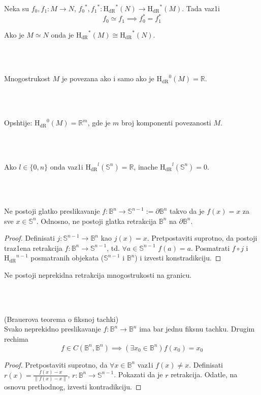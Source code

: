 \documentclass[a4paper,12pt]{article}
\newcommand{\RR}{\mathbb{R}}
\newcommand{\norm}[1]{\left\lVert#1\right\rVert}
\newcommand{\hdr}[1]{{\mathrm{H_{dR}}}^{#1}}
\begin{document}
\begin{posl}
Neka su $f_0, f_1 : M \to N$, ${f_0}^*, {f_1}^* : \hdr{*}(N)\to \hdr{*}(M)$. Tada vaz1i 
\[f_0 \simeq f_1 \implies f_0^* = f_1^*\]
\end{posl}

\begin{posl}
Ako je $M \simeq N$ onda je $\hdr{*}(M) \cong \hdr{*}(N)$.
\end{posl}
\\ \\
\begin{nap}
Mnogostrukost $M$ je povezana ako  i samo ako je $\hdr{0} (M) = \RR$. 
\end{nap}
\\ \\
\begin{nap}
Opshtije: $\hdr{0} (M) = \RR^m$, gde je $m$ broj komponenti povezanosti $M$.
\end{nap}
\\ \\
\begin{nap}
Ako $l \in \{0,n\}$ onda vaz1i $\hdr{l} (\mathbb{S}^n) = \RR$, inache $\hdr{l} (\mathbb{S}^n) = 0$.
\end{nap}
\\ \\
\begin{tvr}
Ne postoji glatko preslikavanje $f: \mathbb{B}^n \to \mathbb{S}^{n-1} := \partial \mathbb{B}^n$ takvo da je $f(x) = x$ za sve $x \in \mathbb{S}^n$. Odnosno, ne postoji glatka retrakcija $\mathbb{B}^n$ na $\partial \mathbb{B}^n$.
\end{tvr}
\begin{proof}
Definisati $j: \mathbb{S}^{n-1} \to \mathbb{B}^n$ kao $j(x) = x$. Pretpostaviti suprotno, da postoji traz1ena retrakcija $f: \mathbb{B}^n \to \mathbb{S}^{n-1}$, td. $\forall a \in \mathbb{S}^{n-1}$ $f(a) = a$. Posmatrati $f \circ j$ i $\hdr{n-1}$ posmatranih objekata ($\mathbb{S}^{n-1}$ i $\mathbb{B}^n$) i izvesti konstradikciju.
\end{proof}
\begin{nap}
Ne postoji neprekidna retrakcija mnogostrukosti na granicu.
\end{nap}
\\ \\
\begin{tma}
(Brauerova teorema o fiksnoj tachki) \\ Svako neprekidno preslikavanje $f: \mathbb{B}^n \to \mathbb{B}^n$ ima bar jednu fiksnu tachku. Drugim rechima
\[f \in C(\mathbb{B}^n, \mathbb{B}^n) \implies (\exists x_0 \in \mathbb{B}^n) f(x_0) = x_0 \]
\end{tma}
\begin{proof}
Pretpostaviti suprotno, da $\forall x \in \mathbb{B}^n$ vaz1i $f(x) \ne x$. Definisati $r(x) = \frac{f(x) - x}{\norm{f(x) - x}}$, $r: \mathbb{B}^n \to \mathbb{S}^{n-1}$. Pokazati da je $r$ retrakcija. Odatle, na osnovu prethodnog, izvesti kontradikciju.
\end{proof}
\end{document}
